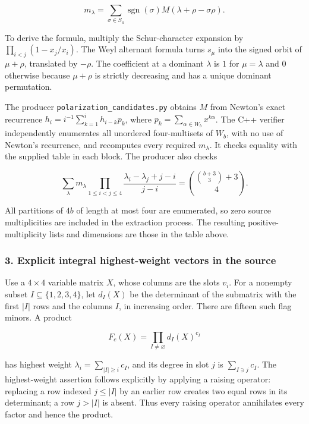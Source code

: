 \documentclass[
  10pt,
]{article}
\begin{document}
\[
 m_\lambda=\sum_{\sigma\in S_4}\operatorname{sgn}(\sigma)
 M(\lambda+\rho-\sigma\rho).
\]

To derive the formula, multiply the Schur-character expansion by
\(\prod_{i<j}(1-x_j/x_i)\). The Weyl alternant formula turns \(s_\mu\)
into the signed orbit of \(\mu+\rho\), translated by \(-\rho\). The
coefficient at a dominant \(\lambda\) is \(1\) for \(\mu=\lambda\) and
\(0\) otherwise because \(\mu+\rho\) is strictly decreasing and has a
unique dominant permutation.

The producer \texttt{\small polarization\_\allowbreak{}candidates.py}
obtains \(M\) from Newton's exact recurrence
\(h_i=i^{-1}\sum_{k=1}^i h_{i-k}p_k\), where
\(p_k=\sum_{\alpha\in W_b}x^{k\alpha}\). The C++ verifier independently
enumerates all unordered four-multisets of \(W_b\), with no use of
Newton's recurrence, and recomputes every required \(m_\lambda\). It
checks equality with the supplied table in each block. The producer also
checks

\[
 \sum_\lambda m_\lambda\prod_{1\le i<j\le4}
 \frac{\lambda_i-\lambda_j+j-i}{j-i}
 =\binom{\binom{b+3}{3}+3}{4}.
\]

All partitions of \(4b\) of length at most four are enumerated, so zero
source multiplicities are included in the extraction process. The
resulting positive-multiplicity lists and dimensions are those in the
table above.

\subsubsection{3. Explicit integral highest-weight vectors in the
source}\label{explicit-integral-highest-weight-vectors-in-the-source}

Use a \(4\times4\) variable matrix \(X\), whose columns are the slots
\(v_i\). For a nonempty subset \(I\subseteq\{1,2,3,4\}\), let \(d_I(X)\)
be the determinant of the submatrix with the first \(|I|\) rows and the
columns \(I\), in increasing order. There are fifteen such flag minors.
A product

\[
 F_c(X)=\prod_{I\ne\varnothing}d_I(X)^{c_I}
\]

has highest weight \(\lambda_i=\sum_{|I|\ge i}c_I\), and its degree in
slot \(j\) is \(\sum_{I\ni j}c_I\). The highest-weight assertion follows
explicitly by applying a raising operator: replacing a row indexed
\(j\le |I|\) by an earlier row creates two equal rows in its
determinant; a row \(j>|I|\) is absent. Thus every raising operator
annihilates every factor and hence the product.
\end{document}
